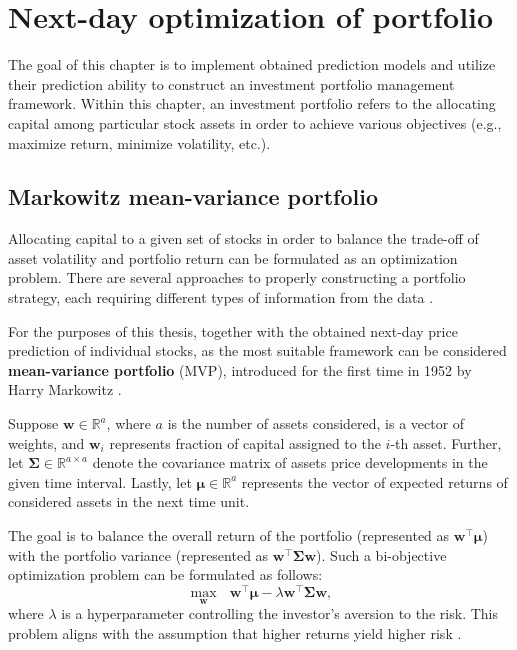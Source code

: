 \chapter{Next-day optimization of portfolio}
\label{chap:4}
The goal of this chapter is to implement obtained prediction models and utilize their prediction ability
to construct an investment portfolio management framework. Within this chapter, an investment portfolio refers
to the allocating capital among particular stock assets in order to achieve various objectives (e.g., maximize return, minimize volatility, etc.).

\section{Markowitz mean-variance portfolio}

Allocating capital to a given set of stocks in order to balance the trade-off of asset volatility 
and portfolio return can be formulated as an optimization problem. There are several approaches
to properly constructing a portfolio strategy, each requiring different types of information from the data \cite{portfolio}.

For the purposes of this thesis, together with the obtained next-day price prediction of individual stocks, as
the most suitable framework can be considered \textbf{mean-variance portfolio} (MVP), introduced for the 
first time in 1952 by Harry Markowitz \cite{portfolio}.

Suppose $\mathbf{w} \in \mathbb{R}^a$, where $a$ is the number of assets considered, is a vector of weights, and $\mathbf{w}_i$ represents
fraction of capital assigned to the $i$-th asset. Further, let $\bm{\Sigma} \in \mathbb{R}^{a \times a}$ denote the covariance matrix of assets price developments
in the given time interval. Lastly, let $\bm{\mu} \in \mathbb{R}^{a}$ represents the vector of expected returns of considered assets in the next time unit.

The goal is to balance the overall return of the portfolio (represented as $\mathbf{w}^{\top}\bm{\mu}$) with the portfolio variance (represented as $\mathbf{w}^{\top}\bm{\Sigma}\mathbf{w}$). Such 
a bi-objective optimization problem can be formulated as follows:
\begin{equation}
    \label{eq:4.1}
    \max_{\mathbf{w}} \>\>\> \mathbf{w}^{\top}\bm{\mu} - \lambda \mathbf{w}^{\top}\bm{\Sigma}\mathbf{w},
\end{equation}
where $\lambda$ is a hyperparameter controlling the investor's aversion to the risk. This problem aligns with the assumption that higher returns yield higher risk \cite{portfolio}.

